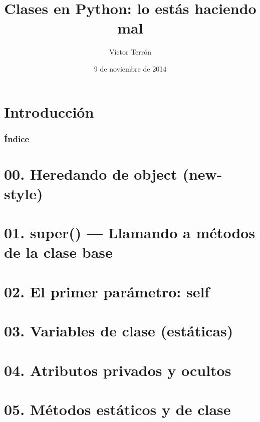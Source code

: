 \documentclass[14pt]{beamer}
\title{Clases en Python: lo estás haciendo mal}
\author{Víctor Terrón}
\date{9 de noviembre de 2014}
\institute{IAA-CSIC}
\newcommand{\punto}[1]{}
\begin{document}
\section{Introducción}



\begin{frame}
  \frametitle{Índice}
  \tableofcontents
\end{frame}


\section{00. Heredando de object (new-style)}
\punto{00}

\section{01. super() — Llamando a métodos de la clase base}
\punto{01}

\section{02. El primer parámetro: self}
\punto{02}

\section{03. Variables de clase (estáticas)}
\punto{03}

\section{04. Atributos privados y ocultos}
\punto{04}

\section{05. Métodos estáticos y de clase}
\punto{05}
\end{document}

